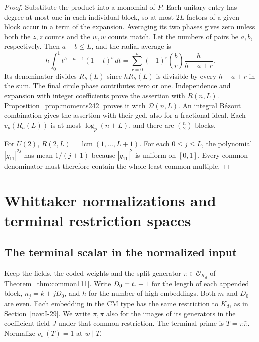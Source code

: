 \documentclass[a4paper,11pt]{article}
\theoremstyle{definition}
\theoremstyle{remark}
\numberwithin{equation}{section}
\begin{document}
\begin{proof}
Substitute the product into a monomial of \(P\). Each unitary
entry has degree at most one in each individual block, so at
most \(2L\) factors of a given block occur in a term of the
expansion. Averaging its two phases gives zero unless both
the \(z,\bar z\) counts and the \(w,\bar w\) counts match.
Let the numbers of pairs be \(a,b\), respectively. Then
\(a+b\le L\), and the radial average is
\[
 h\int_0^1 t^{h+a-1}(1-t)^b\,dt
      =\sum_{r=0}^b(-1)^r\binom br\frac{h}{h+a+r}.
\]
Its denominator divides \(R_h(L)\) since
\(h R_h(L)\) is divisible by every \(h+a+r\) in the sum.
The final circle phase contributes zero or one. Independence
and expansion with integer coefficients prove the assertion
with \(R(n,L)\). Proposition~\ref{prop:moments242} proves it
with \(\mathcal D(n,L)\). An integral B\'ezout combination gives
the assertion with their gcd, also for a fractional ideal.
Each \(v_p(R_h(L))\) is at most \(\log_p(n+L)\), and there are
\(\binom n2\) blocks.

For \(U(2)\), \(R(2,L)=\operatorname{lcm}(1,\ldots,L+1)\).
For each \(0\le j\le L\), the polynomial \(|g_{11}|^{2j}\)
has mean \(1/(j+1)\) because \(|g_{11}|^2\) is uniform on
\([0,1]\). Every common denominator must therefore contain
the whole least common multiple.
\end{proof}

\section{Whittaker normalizations and terminal restriction spaces}\label{nav:terminal-whittaker}

\subsection{The terminal scalar in the normalized input}\label{sec:terminalscalar357}

Keep the fields, the coded weights and the split generator
\(\pi\in\mathcal O_{K_d}\) of Theorem~\ref{thm:common111}.
Write \(D_0=t_{\rm r}+1\) for the length of each appended
block, \(n_j=k+jD_0\), and \(h\) for the number of high
embeddings. Both \(m\) and \(D_0\) are even. Each embedding
in the CM type has the same restriction to \(K_d\), as in
Section~\ref{nav:I-29}. We write \(\pi,\bar\pi\) also for
the images of its generators in the coefficient field \(J\)
under that common restriction. The terminal prime is
\(T=\pi\bar\pi\). Normalize \(v_w(T)=1\) at \(w\mid T\).
\end{document}
